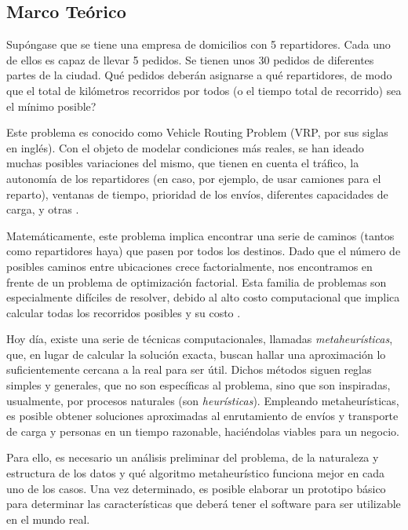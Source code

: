 \message{ !name(proposal.tex)}\documentclass[12pt]{extarticle}
\begin{document}
\subsection{Marco Teórico}
Supóngase que se tiene una empresa de domicilios con 5 repartidores. Cada uno
de ellos es capaz de llevar 5 pedidos. Se tienen unos 30 pedidos de diferentes
partes de la ciudad. Qué pedidos deberán asignarse a qué repartidores, de modo
que el total de kilómetros recorridos por todos (o el tiempo total de recorrido)
sea el mínimo posible?

Este problema es conocido como Vehicle Routing Problem (VRP, por sus siglas en
inglés). Con el objeto de modelar condiciones más reales, se han ideado muchas
posibles variaciones del mismo, que tienen en cuenta el tráfico, la autonomía de
los repartidores (en caso, por ejemplo, de usar camiones para el reparto),
ventanas de tiempo, prioridad de los envíos, diferentes capacidades de carga, y
otras \cite{caceres-cruz_rich_2015}.

Matemáticamente, este problema implica encontrar una serie de caminos (tantos
como repartidores haya) que pasen por todos los destinos. Dado que el número de
posibles caminos entre ubicaciones crece factorialmente, nos encontramos en
frente de un problema de optimización factorial. Esta familia de problemas son
especialmente difíciles de resolver, debido al alto costo computacional que
implica calcular todas los recorridos posibles y su costo \cite{toth_paolo_vehicle_2002}.

Hoy día, existe una serie de técnicas computacionales, llamadas
\textit{metaheurísticas}, que, en lugar de calcular la solución exacta, buscan
hallar una aproximación lo suficientemente cercana a la real para ser útil.
Dichos métodos siguen reglas simples y generales, que no son específicas al
problema, sino que son inspiradas, usualmente, por procesos naturales
(son \textit{heurísticas}). Empleando metaheurísticas, es posible obtener
soluciones aproximadas al enrutamiento de envíos y transporte de carga y
personas en un tiempo razonable, haciéndolas viables para un negocio.

Para ello, es necesario un análisis preliminar del problema, de la naturaleza y
estructura de los datos y qué algoritmo metaheurístico funciona mejor en cada
uno de los casos. Una vez determinado, es posible elaborar un prototipo básico
para determinar las características que deberá tener el software para ser
utilizable en el mundo real.
\end{document}
